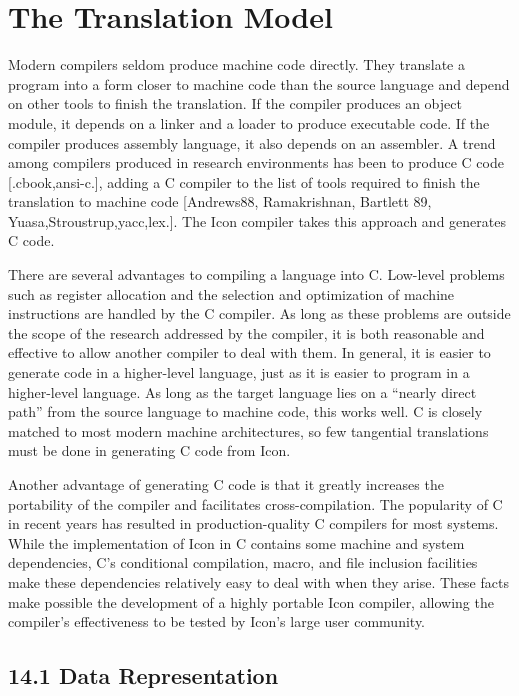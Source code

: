 \clearpage\chapter{The Translation Model}

Modern compilers seldom produce machine code directly. They translate
a program into a form closer to machine code than the source language
and depend on other tools to finish the translation. If the compiler
produces an object module, it depends on a linker and a loader to
produce executable code. If the compiler produces assembly language,
it also depends on an assembler. A trend among compilers
produced in research environments has been to produce C code
[.cbook,ansi-c.], adding a C compiler to the list of tools required to
finish the translation to machine code [Andrews88, Ramakrishnan, Bartlett
89, Yuasa,Stroustrup,yacc,lex.]. The Icon compiler takes this approach
and generates C code.


There are several advantages to compiling a language into C. Low-level
problems such as register allocation and the selection and
optimization of machine instructions are handled by the C compiler. As
long as these problems are outside the scope of the research addressed
by the compiler, it is both reasonable and effective to allow another
compiler to deal with them. In general, it is easier to generate code
in a higher-level language, just as it is easier to program in a
higher-level language. As long as the target language lies on a
``nearly direct path'' from the
source language to machine code, this works well. C is closely matched
to most modern machine architectures, so few tangential translations
must be done in generating C code from Icon.


Another advantage of generating C code is that it greatly increases
the portability of the compiler and facilitates cross-compilation. The
popularity of C in recent years has resulted in production-quality C
compilers for most systems.  While the implementation of Icon in C
contains some machine and system dependencies, C's conditional
compilation, macro, and file inclusion facilities make these
dependencies relatively easy to deal with when they arise. These facts
make possible the development of a highly portable Icon compiler,
allowing the compiler's effectiveness to be tested by Icon's large
user community.

\section[14.1 Data Representation]{14.1 Data Representation}


